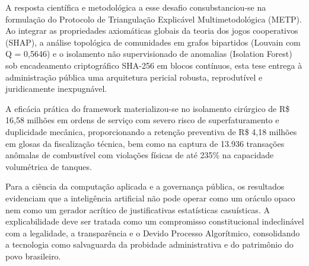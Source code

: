 \documentclass[10pt,a4paper,journal]{article}
\begin{document}
A resposta científica e metodológica a esse desafio consubstanciou-se na formulação do Protocolo de Triangulação Explicável Multimetodológica (METP). Ao integrar as propriedades axiomáticas globais da teoria dos jogos cooperativos (SHAP), a análise topológica de comunidades em grafos bipartidos (Louvain com Q = 0,5646) e o isolamento não supervisionado de anomalias (Isolation Forest) sob encadeamento criptográfico SHA-256 em blocos contínuos, esta tese entrega à administração pública uma arquitetura pericial robusta, reprodutível e juridicamente inexpugnável.

A eficácia prática do framework materializou-se no isolamento cirúrgico de R\$ 16,58 milhões em ordens de serviço com severo risco de superfaturamento e duplicidade mecânica, proporcionando a retenção preventiva de R\$ 4,18 milhões em glosas da fiscalização técnica, bem como na captura de 13.936 transações anômalas de combustível com violações físicas de até 235\% na capacidade volumétrica de tanques.

Para a ciência da computação aplicada e a governança pública, os resultados evidenciam que a inteligência artificial não pode operar como um oráculo opaco nem como um gerador acrítico de justificativas estatísticas casuísticas. A explicabilidade deve ser tratada como um compromisso constitucional indeclinável com a legalidade, a transparência e o Devido Processo Algorítmico, consolidando a tecnologia como salvaguarda da probidade administrativa e do patrimônio do povo brasileiro.
\end{document}
